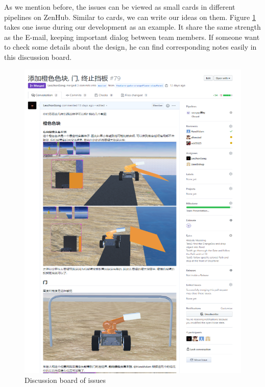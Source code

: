 As we mention before, the issues can be viewed as small cards in different pipelines on ZenHub. Similar to cards, we can write our ideas on them. Figure \ref{fig:issue}
takes one issue during our development as an example. It share the same strength as the E-mail, keeping important dialog between team members. If someone want to check some details about the design, he can find corresponding notes easily in this discussion board.
\begin{figure}
    \centering
    \includegraphics[width=14cm]{management/img_management/issue.png}
    \caption{Discussion board of issues}
    \label{fig:issue}
\end{figure}
